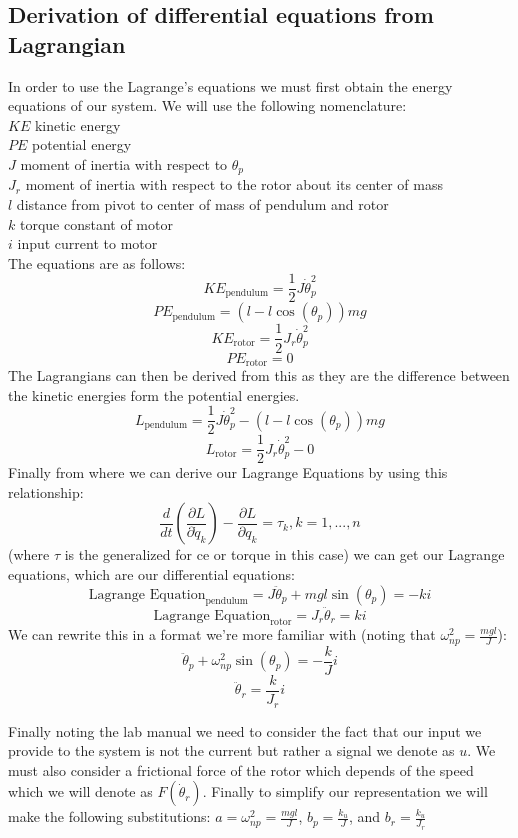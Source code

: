 \subsection{Derivation of differential equations from Lagrangian}
In order to use the Lagrange's equations we must first obtain the energy equations of our system. We will use the following nomenclature:\\
$KE$ kinetic energy\\
$PE$ potential energy\\
$J$ moment of inertia with respect to $\theta_p$\\
$J_r$ moment of inertia with respect to the rotor about its center of mass\\
$l$ distance from pivot to center of mass of pendulum and rotor\\
$k$ torque constant of motor\\
$i$ input current to motor\\
The equations are as follows:
$$KE_{\text{pendulum}} = \frac{1}{2}J\dot\theta_p^2$$
$$PE_{\text{pendulum}} = (l-l\cos(\theta_p))mg$$
$$KE_{\text{rotor}} = \frac{1}{2}J_r\dot\theta_p^2$$
$$PE_{\text{rotor}} = 0$$
The Lagrangians can then be derived from this as they are the difference between the kinetic energies form the potential energies.
$$L_{\text{pendulum}} = \frac{1}{2}J\dot\theta_p^2-(l-l\cos(\theta_p))mg$$
$$L_{\text{rotor}} = \frac{1}{2}J_r\dot\theta_p^2-0$$
Finally from where we can derive our Lagrange Equations by using this relationship:
$$\frac{d}{dt}\left(\frac{\partial L}{\partial\dot q_k}\right)-\frac{\partial L}{\partial q_k}=\tau_k, k = 1,...,n$$
(where $\tau$ is the generalized for ce or torque in this case) we can get our Lagrange equations, which are our differential equations:
$$\text{Lagrange Equation}_{\text{pendulum}} = J\ddot\theta_p+mgl\sin(\theta_p)=-ki$$
$$\text{Lagrange Equation}_{\text{rotor}} = J_r\ddot\theta_r=ki$$
We can rewrite this in a format we're more familiar with (noting that $\omega_{np}^2 = \frac{mgl}{J}$):
$$\ddot\theta_p+\omega_{np}^2\sin(\theta_p)=-\frac{k}{J}i$$
$$\ddot\theta_r=\frac{k}{J_r}i$$

Finally noting the lab manual we need to consider the fact that our input we provide to the system is not the current but rather a signal we denote as $u$. We must also consider a frictional force of the rotor which depends of the speed which we will denote as $F(\dot\theta_r)$. Finally to simplify our representation we will make the following substitutions: $a = \omega_{np}^2 = \frac{mgl}{J}$, $b_p = \frac{k_u}{J}$, and $b_r = \frac{k_u}{J_r}$

